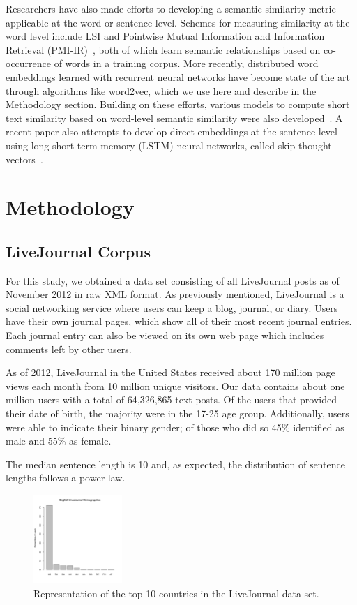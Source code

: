 \documentclass{sigchi}
\begin{document}
Researchers have also made efforts to developing a semantic similarity metric applicable at the word or sentence level. Schemes for measuring similarity at the word level include LSI and Pointwise Mutual Information and Information Retrieval (PMI-IR)~\cite{turney2001}, both of which learn semantic relationships based on co-occurrence of words in a training corpus. More recently, distributed word embeddings learned with recurrent neural networks have become state of the art through algorithms like word2vec, which we use here and describe in the Methodology section. Building on these efforts, various models to compute short text similarity  based on  word-level semantic similarity were also developed~\cite{mihalcea2006,kenter15short}. A recent paper also attempts to develop direct embeddings at the sentence level using long short term memory (LSTM) neural networks, called skip-thought vectors~\cite{kiros2015skip}. 

\section{Methodology}

\subsection{LiveJournal Corpus}
For this study, we obtained a data set consisting of all LiveJournal posts as of November 2012 in raw XML format. As previously mentioned, LiveJournal is a social networking service where users can keep a blog, journal, or diary. Users have their own journal pages, which show all of their most recent journal entries. Each journal entry can also be viewed on its own web page which includes comments left by other users. 

As of 2012, LiveJournal in the United States received about 170 million page views each month from 10 million unique visitors. Our data contains about one million users with a total of 64,326,865 text posts. Of the users that provided their date of birth, the majority were in the 17-25 age group. Additionally, users were able to indicate their binary gender; of those who did so 45\% identified as male and 55\% as female. 

The median sentence length is 10 and, as expected, the distribution of sentence lengths follows a power law.

\begin{figure}[tb]
\centering \includegraphics[width=0.3\textwidth]{figures/demographics} 
\caption{Representation of the top 10 countries in the LiveJournal data set.  \label{fig:demographics}}
\end{figure}
\end{document}
